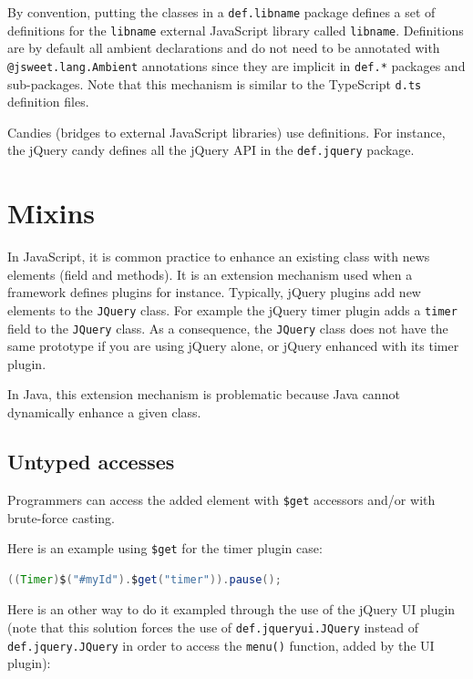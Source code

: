 \documentclass[a4paper]{report}
\begin{document}
By convention, putting the classes in a \texttt{def.libname} package defines a set of definitions for the \texttt{libname} external JavaScript library called \texttt{libname}. Definitions are by default all ambient declarations and do not need to be annotated with \texttt{@jsweet.lang.Ambient} annotations since they are implicit in \texttt{def.*} packages and sub-packages. Note that this mechanism is similar to the TypeScript \texttt{d.ts} definition files.

Candies (bridges to external JavaScript libraries) use definitions. For instance, the jQuery candy defines all the jQuery API in the \texttt{def.jquery} package.

\section{Mixins}

In JavaScript, it is common practice to enhance an existing class with news elements (field and methods). It is an extension mechanism used when a framework defines plugins for instance. Typically, jQuery plugins add new elements to the \texttt{JQuery} class. For example the jQuery timer plugin adds a \texttt{timer} field to the \texttt{JQuery} class. As a consequence, the \texttt{JQuery} class does not have the same prototype if you are using jQuery alone, or jQuery enhanced with its timer plugin.

In Java, this extension mechanism is problematic because Java cannot dynamically enhance a given class. 

\subsection{Untyped accesses}

Programmers can access the added element with \texttt{\$get} accessors and/or with brute-force casting. 

Here is an example using \texttt{\$get} for the timer plugin case:

\begin{lstlisting}[language=Java]
((Timer)$("#myId").$get("timer")).pause();
\end{lstlisting}

Here is an other way to do it exampled through the use of the jQuery UI plugin (note that this solution forces the use of \texttt{def.jqueryui.JQuery} instead of \texttt{def.jquery.JQuery} in order to access the \texttt{menu()} function, added by the UI plugin):
\end{document}
